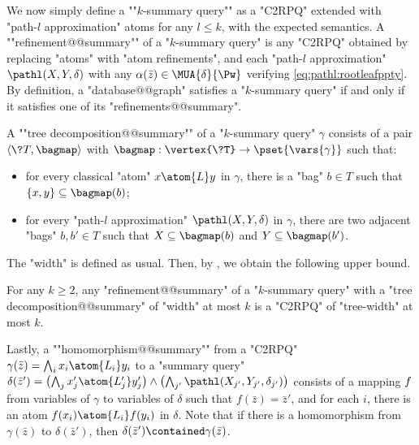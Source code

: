 \AP We now simply define a ""$k$-summary query"" as a "C2RPQ" extended with "path-$l$ approximation" atoms for any $l\leq k$, with the expected semantics.
A \AP""refinement@@summary"" of a "$k$-summary query" is any "C2RPQ" obtained by
replacing "atoms" with "atom refinements", and 
each "path-$l$ approximation" $\pathl(X, Y, \delta)$ with any
$\alpha(\bar z) \in \MUA{\delta}{\Pw}$ verifying \eqref{eq:pathl:rootleafppty}. By definition,
a "database@@graph" satisfies a "$k$-summary query" if and only if it
satisfies one of its "refinements@@summary".

A \AP ""tree decomposition@@summary"" of a "$k$-summary query" $\gamma$ consists of
a pair $\tup{\?T, \bagmap}$ with $\bagmap: \vertex{\?T} \to \pset{\vars{\gamma}}$
such that:
\begin{itemize}
	\item for every classical "atom" $x \atom{L} y$ in $\gamma$,
		there is a "bag" $b \in T$ such that $\{x,y\} \subseteq \bagmap(b)$;
	\item for every "path-$l$ approximation" $\pathl(X, Y, \delta)$ in $\gamma$,
		there are two adjacent "bags" $b, b' \in T$ such that $X \subseteq \bagmap(b)$
		and $Y \subseteq \bagmap(b')$.
\end{itemize}
The "width" is defined as usual. Then, by
, we obtain the following upper bound.

\begin{fact}
	\AP\label{fact:tree-width-summary}
	For any $k\geq 2$, any "refinement@@summary" of a "$k$-summary query" with
	a "tree decomposition@@summary" of "width" at most $k$ is a "C2RPQ" of "tree-width" at most $k$.
\end{fact}

Lastly, a \AP""homomorphism@@summary"" from a "C2RPQ"
$\gamma(\bar z) = \bigwedge_{i} x_i \atom{L_i} y_i$
to a "summary query" $\delta(\bar z') =
\bigl( \bigwedge_{j} x'_j \atom{L'_j} y'_j \bigr)
\wedge \bigl( \bigwedge_{j'} \pathl(X_{j'}, Y_{j'}, \delta_{j'}) \bigr)$
consists of a mapping $f$ from variables of $\gamma$ to variables of $\delta$
such that $f(\bar z) = \bar z'$, and for each $i$,
there is an atom $f(x_i) \atom{L_i} f(y_i)$ in $\delta$.
Note that if there is a homomorphism from $\gamma(\bar z)$ to $\delta(\bar z')$,
then $\delta(\bar z') \contained \gamma(\bar z)$.

